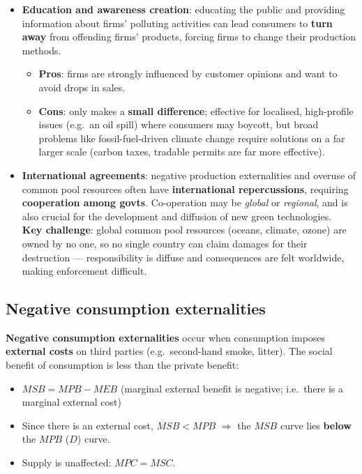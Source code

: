\documentclass[a4paper,12pt]{article}
\begin{document}
\begin{itemize}
\begin{itemize}
\begin{itemize}
      \item Requires a supporting \textbf{legal system of land/resource rights} to function effectively.
    \end{itemize}
  \end{itemize}
  \item \textbf{Education and awareness creation}: educating the public and providing information about firms' polluting activities can lead consumers to \textbf{turn away} from offending firms' products, forcing firms to change their production methods.
  \begin{itemize}
    \item \textbf{Pros}: firms are strongly influenced by customer opinions and want to avoid drops in sales.
    \item \textbf{Cons}: only makes a \textbf{small difference}; effective for localised, high-profile issues (e.g.\ an oil spill) where consumers may boycott, but broad problems like fossil-fuel-driven climate change require solutions on a far larger scale (carbon taxes, tradable permits are far more effective).
  \end{itemize}
  \item \textbf{International agreements}: negative production externalities and overuse of common pool resources often have \textbf{international repercussions}, requiring \textbf{cooperation among govts}. Co-operation may be \textit{global} or \textit{regional}, and is also crucial for the development and diffusion of new green technologies.\\
  \textbf{Key challenge}: global common pool resources (oceans, climate, ozone) are owned by no one, so no single country can claim damages for their destruction --- responsibility is diffuse and consequences are felt worldwide, making enforcement difficult.
\end{itemize}
\subsection{Negative consumption externalities}
\textbf{Negative consumption externalities} occur when consumption imposes \textbf{external costs} on third parties (e.g.\ second-hand smoke, litter). The social benefit of consumption is less than the private benefit:
\begin{itemize}
  \item $MSB = MPB - MEB$ (marginal external benefit is negative; i.e.\ there is a marginal external cost)
  \item Since there is an external cost, $MSB < MPB$ $\Rightarrow$ the $MSB$ curve lies \textbf{below} the $MPB$ ($D$) curve.
  \item Supply is unaffected: $MPC = MSC$.
\end{itemize}
\end{document}
